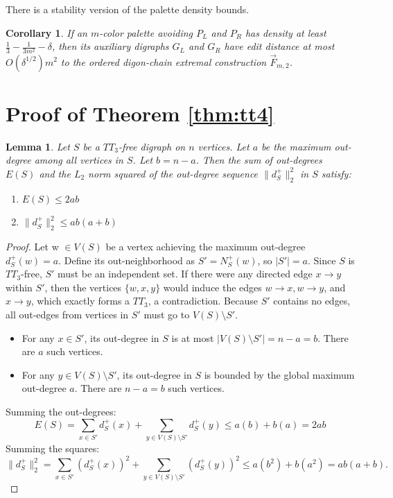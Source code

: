 \documentclass[a4paper]{amsart}
\newtheorem{lemma}[theorem]{Lemma}
\newtheorem{corollary}[theorem]{Corollary}
\begin{document}
There is a stability version of the palette density bounds.

\begin{corollary} \label{cor:stability}
If an $m$-color palette avoiding $P_L$ and $P_R$ has density at least $\frac{1}{3} - \frac{1}{3m^2} - \delta$,
then its auxiliary digraphs $G_L$ and $G_R$ have edit distance at most $O(\delta^{1/2}) m^2$ to the ordered digon-chain extremal construction $\vec{F}_{m,2}$.
\end{corollary}



\section{Proof of Theorem \ref{thm:tt4}}

\begin{lemma} \label{lem:tt3_free}
Let $S$ be a $TT_3$-free digraph on $n$ vertices.
Let $a$ be the maximum out-degree among all vertices in $S$.
Let $b = n - a$.
Then the sum of out-degrees $E(S)$ and the $L_2$ norm squared of the out-degree sequence $\|d^+_S\|_2^2$ in $S$ satisfy:
\begin{enumerate}
\item $E(S) \le 2ab$
\item $\|d^+_S\|_2^2 \le ab(a+b)$
\end{enumerate}
\end{lemma}

\begin{proof}
Let w $\in V(S)$ be a vertex achieving the maximum out-degree $d^+_S(w) = a$.
Define its out-neighborhood as $S' = N^+_S(w)$, so $|S'| = a$.
Since $S$ is $TT_3$-free, $S'$ must be an independent set.
If there were any directed edge $x \to y$ within $S'$, then the vertices $\{w, x, y\}$ would induce the edges $w \to x, w \to y$, and $x \to y$, which exactly forms a $TT_3$, a contradiction.
Because $S'$ contains no edges, all out-edges from vertices in $S'$ must go to $V(S) \setminus S'$.
\begin{itemize}
\item For any $x \in S'$, its out-degree in $S$ is at most $|V(S) \setminus S'| = n - a = b$.
There are $a$ such vertices.
\item For any $y \in V(S) \setminus S'$, its out-degree in $S$ is bounded by the global maximum out-degree $a$.
There are $n - a = b$ such vertices.
\end{itemize}

Summing the out-degrees:
\[
E(S) = \sum_{x \in S'} d^+_S(x) + \sum_{y \in V(S) \setminus S'} d^+_S(y) \le a(b) + b(a) = 2ab
\]
Summing the squares:
\[
\|d^+_S\|_2^2 = \sum_{x \in S'} (d^+_S(x))^2 + \sum_{y \in V(S) \setminus S'} (d^+_S(y))^2 \le a(b^2) + b(a^2) = ab(a+b). 
\]
\end{proof}
\end{document}
